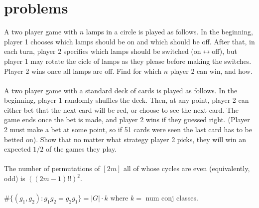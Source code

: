 \documentclass[english]{article}
\begin{document}


\newpage
\section*{problems}

A two player game with $n$ lamps in a circle is played as follows. In the beginning, player 1 chooses which lamps should be on and which should be off. After that, in each turn, player 2 specifies which lamps should be switched (on$\leftrightarrow$off), but player 1 may rotate the cicle of lamps as they please before making the switches. Player 2 wins once all lamps are off. Find for which $n$ player 2 can win, and how.
\\\\%

A two player game with a standard deck of cards is played as follows. In the beginning, player 1 randomly shuffles the deck. Then, at any point, player 2 can either bet that the next card will be red, or choose to see the next card. The game ends once the bet is made, and player 2 wins if they guessed right. (Player 2 must make a bet at some point, so if 51 cards were seen the last card has to be betted on). Show that no matter what strategy player 2 picks, they will win an expected $1/2$ of the games they play.
\\\\%

The number of permutations of $[2m]$ all of whose cycles are even (equivalently, odd) is $((2m-1)!!)^2$.
\\\\%

$\#\{(g_1,g_2):g_1g_2=g_2g_1\}=|G|\cdot k$ where $k=$ num conj classes.
\end{document}

